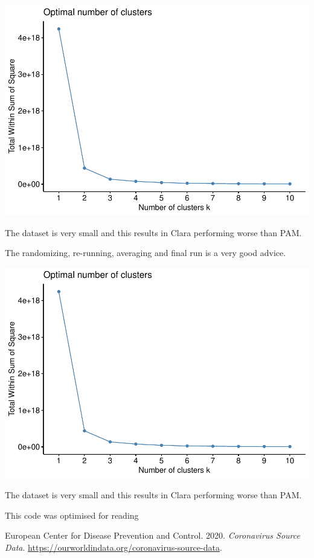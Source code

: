 \documentclass[
]{article}
\begin{document}
\includegraphics{Assignment1_files/figure-latex/unnamed-chunk-28-1.pdf}

The dataset is very small and this results in Clara performing worse than PAM.

The randomizing, re-running, averaging and final run is a very good advice.

\includegraphics{Assignment1_files/figure-latex/pressure-1.pdf}

The dataset is very small and this results in Clara performing worse than PAM.

This code was optimised for reading

\hypertarget{refs}{}
\leavevmode\hypertarget{ref-WorldInData}{}%
European Center for Disease Prevention and Control. 2020. \emph{Coronavirus Source Data}. \url{https://ourworldindata.org/coronavirus-source-data}.
\end{document}
